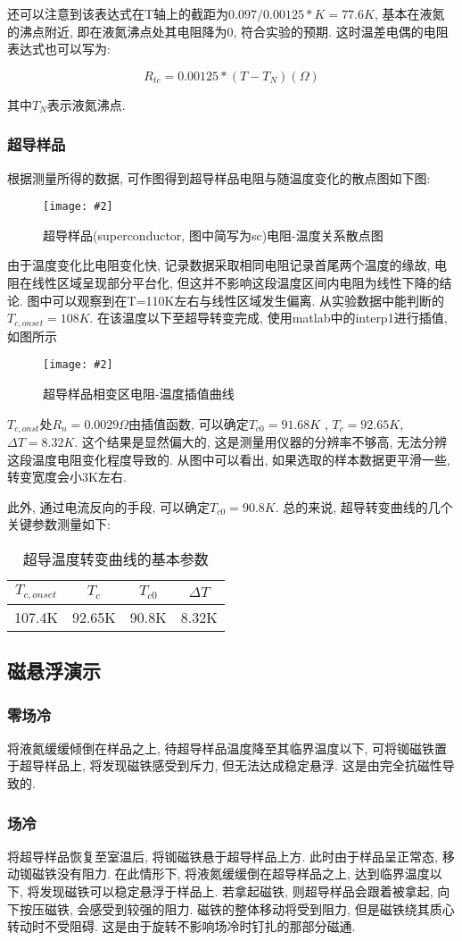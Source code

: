 \documentclass[12pt,a4paper]{article}
\newcommand{\be}[1]{
    \begin{equation}
        #1
    \end{equation}
}
\newcommand{\bfig}[3]{
    \begin{figure}[H]
        \centering
        \texttt{[image: \#2]}
        \caption{#3}
    \end{figure}
}
\begin{document}
还可以注意到该表达式在T轴上的截距为$0.097/0.00125*K=77.6K$, 基本在液氮的沸点附近, 即在液氮沸点处其电阻降为0, 符合实验的预期. 这时温差电偶的电阻表达式也可以写为: 
\be{R_{tc}=0.00125*(T-T_N)(\Omega)}
其中$T_N$表示液氮沸点. 

\subsubsection{超导样品}
根据测量所得的数据, 可作图得到超导样品电阻与随温度变化的散点图如下图:
\bfig{0.8}{rsc1.jpg}{超导样品(superconductor, 图中简写为sc)电阻-温度关系散点图}
由于温度变化比电阻变化快, 记录数据采取相同电阻记录首尾两个温度的缘故, 电阻在线性区域呈现部分平台化, 但这并不影响这段温度区间内电阻为线性下降的结论. 
图中可以观察到在T=110K左右与线性区域发生偏离. 从实验数据中能判断的$T_{c,onset}=108K$. 在该温度以下至超导转变完成, 使用matlab中的interp1进行插值, 如图所示
\bfig{0.8}{rsc2.jpg}{超导样品相变区电阻-温度插值曲线}
$T_{c,onst}$处$R_n=0.0029\Omega$由插值函数, 可以确定$T_{c0}=91.68K$ , $T_{c}=92.65K$, $\Delta T=8.32K$. 这个结果是显然偏大的, 这是测量用仪器的分辨率不够高, 无法分辨这段温度电阻变化程度导致的. 从图中可以看出, 如果选取的样本数据更平滑一些, 转变宽度会小3K左右. 

此外, 通过电流反向的手段, 可以确定$T_{c0}=90.8K$. 总的来说, 超导转变曲线的几个关键参数测量如下: 
\begin{table}[H]
    \centering
    \begin{tabular}{|c|c|c|c|}
    \hline
    $T_{c,onset}$ & $T_c$     & $T_{c0}$   & $\Delta T$ \\ \hline
    107.4K  & 92.65K & 90.8K & 8.32K  \\ \hline
    \end{tabular}
    \caption{超导温度转变曲线的基本参数}
    \end{table}

\subsection{磁悬浮演示}
\subsubsection{零场冷}
将液氮缓缓倾倒在样品之上, 待超导样品温度降至其临界温度以下, 可将铷磁铁置于超导样品上, 将发现磁铁感受到斥力, 但无法达成稳定悬浮. 
这是由完全抗磁性导致的. 
\subsubsection{场冷}
将超导样品恢复至室温后, 将铷磁铁悬于超导样品上方. 此时由于样品呈正常态, 移动铷磁铁没有阻力. 在此情形下, 将液氮缓缓倒在超导样品之上, 达到临界温度以下, 将发现磁铁可以稳定悬浮于样品上. 
若拿起磁铁, 则超导样品会跟着被拿起, 向下按压磁铁, 会感受到较强的阻力.  磁铁的整体移动将受到阻力, 但是磁铁绕其质心转动时不受阻碍. 这是由于旋转不影响场冷时钉扎的那部分磁通. 
\end{document}
